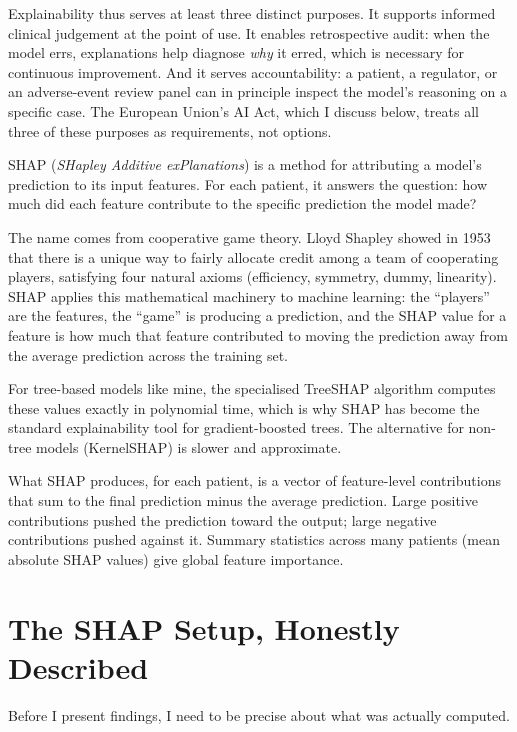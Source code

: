 Explainability thus serves at least three distinct purposes. It supports informed clinical judgement at the point of use. It enables retrospective audit: when the model errs, explanations help diagnose \emph{why} it erred, which is necessary for continuous improvement. And it serves accountability: a patient, a regulator, or an adverse-event review panel can in principle inspect the model's reasoning on a specific case. The European Union's AI Act, which I discuss below, treats all three of these purposes as requirements, not options.

\begin{notebox}
SHAP (\emph{SHapley Additive exPlanations}) is a method for attributing a model's prediction to its input features. For each patient, it answers the question: how much did each feature contribute to the specific prediction the model made?

The name comes from cooperative game theory. Lloyd Shapley showed in 1953 that there is a unique way to fairly allocate credit among a team of cooperating players, satisfying four natural axioms (efficiency, symmetry, dummy, linearity). SHAP applies this mathematical machinery to machine learning: the ``players'' are the features, the ``game'' is producing a prediction, and the SHAP value for a feature is how much that feature contributed to moving the prediction away from the average prediction across the training set.

For tree-based models like mine, the specialised TreeSHAP algorithm computes these values exactly in polynomial time, which is why SHAP has become the standard explainability tool for gradient-boosted trees. The alternative for non-tree models (KernelSHAP) is slower and approximate.

What SHAP produces, for each patient, is a vector of feature-level contributions that sum to the final prediction minus the average prediction. Large positive contributions pushed the prediction toward the output; large negative contributions pushed against it. Summary statistics across many patients (mean absolute SHAP values) give global feature importance.
\end{notebox}

\section{The SHAP Setup, Honestly Described}

Before I present findings, I need to be precise about what was actually computed.


